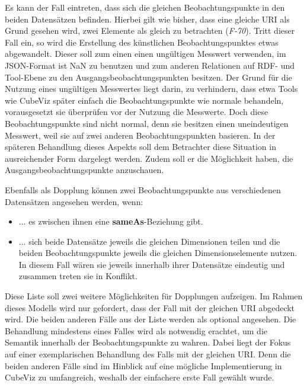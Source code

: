 \documentclass[11pt]{article}
\newcommand{\com}[1]{\marginpar{\em {\small{#1}}}} %
\begin{document}
\noindent
Es kann der Fall eintreten,\com{Dopplungen} dass sich die gleichen Beobachtungspunkte in den beiden Datensätzen befinden. Hierbei gilt wie bisher, dass eine gleiche URI als Grund gesehen wird, zwei Elemente als gleich zu betrachten (\textit{F-70})\com{Anforderung \\ F-70, S. \pageref{req:F70}}\label{req:F70source}. Tritt dieser Fall ein, so wird die Erstellung des künstlichen Beobachtungspunktes etwas abgewandelt. Dieser soll zum einen einen ungültigen Messwert verwenden, im JSON-Format ist NaN zu benutzen und zum anderen Relationen auf RDF- und Tool-Ebene zu den Ausgangsbeobachtungspunkten besitzen. Der Grund für die Nutzung eines ungültigen Messwertes liegt darin, zu verhindern, dass etwa Tools wie CubeViz später einfach die Beobachtungspunkte wie normale behandeln, vorausgesetzt sie überprüfen vor der Nutzung die Messwerte. Doch diese Beobachtungspunkte sind nicht normal, denn sie besitzen einen uneindeutigen Messwert, weil sie auf zwei anderen Beobachtungspunkten basieren. In der späteren Behandlung dieses Aspekts soll dem Betrachter diese Situation in ausreichender Form dargelegt werden. Zudem soll er die Möglichkeit haben, die Ausgangsbeobachtungspunkte anzuschauen. 

Ebenfalls als Dopplung\com{Weitere \\Fälle} können zwei Beobachtungspunkte aus verschiedenen Datensätzen angesehen werden, wenn:

\begin{itemize}

    \item ... es zwischen ihnen eine \textbf{sameAs}-Beziehung gibt. 
    
    \item ... sich beide Datensätze jeweils die gleichen Dimensionen teilen und die beiden Beobachtungspunkte jeweils die gleichen Dimensionselemente nutzen. In diesem Fall wären sie jeweils innerhalb ihrer Datensätze eindeutig und zusammen treten sie in Konflikt. 

\end{itemize}

\noindent
Diese Liste soll zwei weitere Möglichkeiten für Dopplungen aufzeigen. Im Rahmen dieses Modells wird nur gefordert, dass der Fall mit der gleichen URI abgedeckt wird. Die beiden anderen Fälle aus der Liste werden als optional angesehen. Die Behandlung mindestens eines Falles wird als notwendig erachtet, um die Semantik innerhalb der Beobachtungspunkte zu wahren. Dabei liegt der Fokus auf einer exemplarischen Behandlung des Falls mit der gleichen URI. Denn die beiden anderen Fälle sind im Hinblick auf eine mögliche Implementierung in CubeViz zu umfangreich, weshalb der einfachere erste Fall gewählt wurde.
\end{document}
